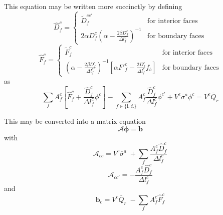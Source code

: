 \documentclass[12pt]{article}
\newcommand{\bfunc}{\ensuremath{f_{b}}}
\begin{document}
This equation may be written more succinctly by defining
\begin{equation}
  \boxed{
        \hat{D}^{c}_{f}
               = \left\{
                     \begin{array}{ll}
                        \tilde{D}^{cc'}_{f}
                        & \text{for interior faces} \\
                        2\alpha D^{c}_{f}
                           \left( \alpha - \frac{2 \beta D^{c}_{f}}{\Delta l^{c}_{f}}
                           \right)^{-1}
                        & \text{for boundary faces}
                     \end{array}
                    \right.
   }
\end{equation}
\begin{equation}
   \boxed{
        \hat{F}^{c}_{f}
             =  \left\{
                     \begin{array}{ll}
                        \tilde{F}^{c}_{f}
                        & \text{for interior faces} \\
                           \left( \alpha - \frac{2 \beta D^{c}_{f}}{\Delta l^{c}_{f}}
                           \right)^{-1}
                        \left[ \alpha {F'}^{c}_{f}
                                 - \frac{2 D^{c}_{f}}{\Delta l^{c}_{f}} \bfunc
                        \right]
                        & \text{for boundary faces}
                     \end{array}
                    \right.
  }
\end{equation}
as
\begin{equation}
        \sum_{f} A^{c}_{f}
             \left[
                 \hat{F}^{c}_{f}
                         + \frac{\hat{D}^{c}_{f}}{\Delta l^{c}_{f}}  \phi^{c}
             \right]
        - \sum_{f \in \{\text{i.\ f.}\}}
                A^{c}_{f} \frac{\hat{D}^{c}_{f}}{\Delta l^{c}_{f}} \phi^{c'}
        + V^{c} \bar{\sigma}^{a} \phi^{c}
                = V^{c} \bar{Q}_{r}
\end{equation}

This may be converted into a matrix equation
\begin{equation}
        \mathcal{A} \boldsymbol{\phi} = \mathbf{b}
\end{equation}
with
\begin{equation}
   \boxed{
        \mathcal{A}_{cc} = V^{c} \bar{\sigma}^{a} \;
                + \sum_{f}
                        \frac{A^{c}_{f} \hat{D}^{c}_{f}}{\Delta l^{c}_{f}}
   }
\end{equation}
\begin{equation}
   \boxed{
        \mathcal{A}_{cc'} =
                 - \frac{A^{c}_{f} \hat{D}^{c}_{f}}{\Delta l^{c}_{f}}
   }
\label{eq:Accp}
\end{equation}
and
\begin{equation}
   \boxed{
        \mathbf{b}_{c} = V^{c} \bar{Q}_{r} \;
                - \sum_{f} A^{c}_{f} \hat{F}^{c}_{f}
   }
\end{equation}
\end{document}
